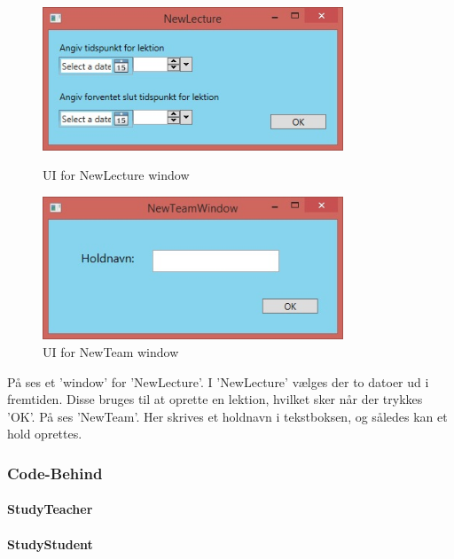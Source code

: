 \begin{figure}[htbp]
\centering
\begin{minipage}{.5\textwidth}
  \centering
  \includegraphics[width=0.8\textwidth]{images/UI/NewLecture.jpg}
  \caption[UINewLecture]{UI for NewLecture window}
  \label{fig:NewLecture}
\end{minipage}%
\begin{minipage}{.5\textwidth}
  \centering
  \includegraphics[width=0.8\textwidth]{images/UI/NewTeam.jpg}
  \caption[UINewTeam]{UI for NewTeam window}
  \label{fig:NewTeam}
\end{minipage}%
\end{figure}

På  ses et 'window' for 'NewLecture'. 
I 'NewLecture' vælges der to datoer ud i fremtiden. Disse bruges til at oprette en lektion, hvilket sker når der trykkes 'OK'. 
På  ses 'NewTeam'. Her skrives et holdnavn i tekstboksen, og således kan et hold oprettes.

\subsubsection{Code-Behind}
\paragraph{StudyTeacher}
\paragraph{StudyStudent}
